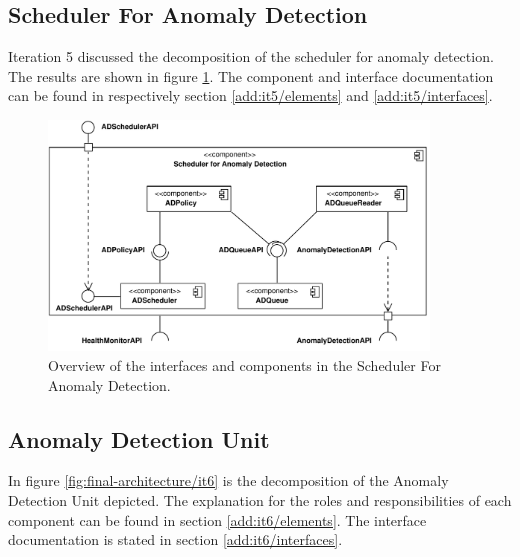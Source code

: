 \subsection{Scheduler For Anomaly Detection}

\npar Iteration 5 discussed the decomposition of the scheduler for anomaly
detection. The results are shown in figure \ref{fig:final-architecture/it5}. The
component and interface documentation can be found in respectively section
\ref{add:it5/elements} and \ref{add:it5/interfaces}.

\begin{figure}
	\begin{centering}
		\includegraphics[width=0.9\textwidth]{figs/add-it5-interfaces.pdf}
		\caption{Overview of the interfaces and components in the Scheduler For
		Anomaly Detection.}
		\label{fig:final-architecture/it5}
	\end{centering}
\end{figure}

\subsection{Anomaly Detection Unit}

\npar In figure \ref{fig:final-architecture/it6} is the decomposition of the
Anomaly Detection Unit depicted. The explanation for the roles and
responsibilities of each component can be found in section
\ref{add:it6/elements}. The interface documentation is stated in section
\ref{add:it6/interfaces}.

